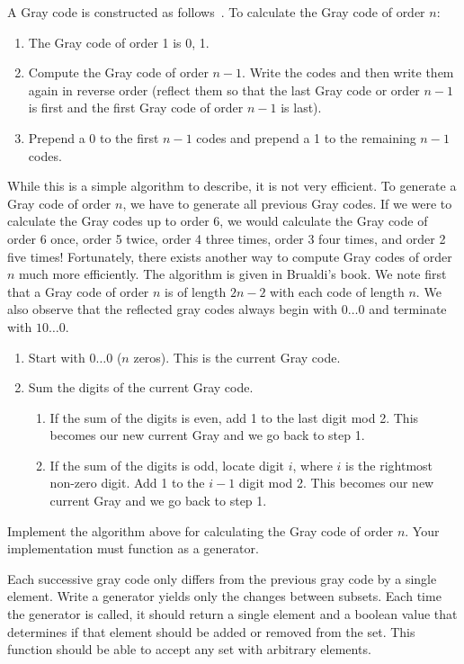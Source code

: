 A Gray code is constructed as follows~.  To calculate the Gray code of order $n$:
\begin{enumerate}
\item The Gray code of order 1 is 0, 1.
\item Compute the Gray code of order $n-1$.  Write the codes and then write them again in reverse order (reflect them so that the last Gray code or order $n-1$ is first and the first Gray code of order $n-1$ is last).
\item Prepend a 0 to the first $n-1$ codes and prepend a 1 to the remaining $n-1$ codes.
\end{enumerate}
While this is a simple algorithm to describe, it is not very efficient.  
To generate a Gray code of order $n$, we have to generate all previous Gray codes.  
If we were to calculate the Gray codes up to order 6, we would calculate the Gray code of order 6 once, order 5 twice, order 4 three times, order 3 four times, and order 2 five times!
Fortunately, there exists another way to compute Gray codes of order $n$ much more efficiently.
The algorithm is given in Brualdi's book.  
We note first that a Gray code of order $n$ is of length $2n-2$ with each code of length $n$.
We also observe that the reflected gray codes always begin with $0\dots0$ and terminate with $10\dots0$.
\begin{enumerate}
\item Start with $0\dots0$ ($n$ zeros).  This is the current Gray code.
\item Sum the digits of the current Gray code.
\begin{enumerate}
\item If the sum of the digits is even, add 1 to the last digit mod 2.
This becomes our new current Gray and we go back to step 1.
\item If the sum of the digits is odd, locate digit $i$, where $i$ is the rightmost non-zero digit.  Add 1 to the $i-1$ digit mod 2.  This becomes our new current Gray and we go back to step 1.
\end{enumerate}
\end{enumerate}

\begin{problem}
\label{prob:brualdi_gray}
Implement the algorithm above for calculating the Gray code of order $n$.
Your implementation must function as a generator.
\end{problem}

\begin{problem}
Each successive gray code only differs from the previous gray code by a single element.
Write a generator yields only the changes between subsets.  Each time the generator is called, 
it should return a single element and a boolean value that determines if that element should be
added or removed from the set.  This function should be able to accept any set with arbitrary elements.
\end{problem}

